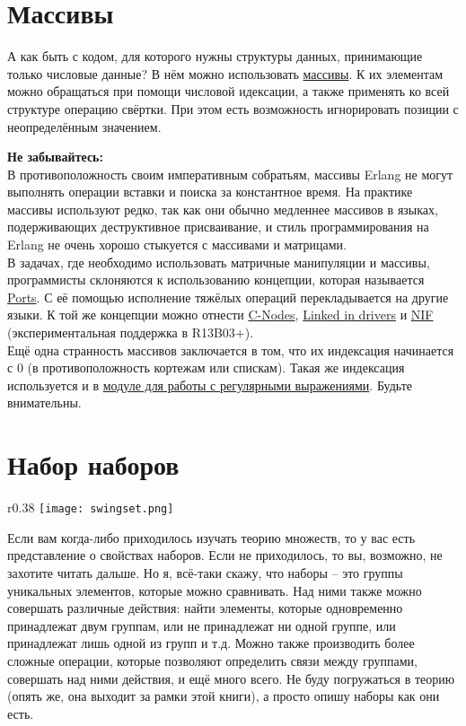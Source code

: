 \section{Массивы}
\label{arrays}
А как быть с кодом, для которого нужны структуры данных, принимающие только числовые данные?
В нём можно использовать \href{http://erldocs.com/R15B/stdlib/array.html}{массивы}.
К их элементам можно обращаться при помощи числовой идексации, а также применять ко всей структуре операцию свёртки.
При этом есть возможность игнорировать позиции с неопределённым значением.
\colorbox{lorange}
{
    \begin{minipage}{1.0\linewidth}
        \textbf{Не забывайтесь:}\\
В противоположность своим императивным собратьям, массивы Erlang не могут выполнять операции вставки и поиска за константное время.
На практике массивы используют редко, так как они обычно медленнее массивов в языках, подерживающих деструктивное присваивание, и стиль программирования на Erlang не очень хорошо стыкуется с массивами и матрицами.\\
В задачах, где необходимо использовать матричные манипуляции и массивы, программисты склоняются к использованию концепции, которая называется \href{http://www.erlang.org/doc/tutorial/c\_port.html}{Ports}.
С её помощью исполнение тяжёлых операций перекладывается на другие языки.
К той же концепции можно отнести \href{http://www.erlang.org/doc/tutorial/cnode.html}{C-Nodes}, \href{http://www.erlang.org/doc/tutorial/c\_portdriver.html}{Linked in drivers} и \href{http://erldocs.com/R15B/erts/erl\_nif.html}{NIF} (экспериментальная поддержка в R13B03+).\\
Ещё одна странность массивов заключается в том, что их индексация начинается с 0 (в противоположность кортежам или спискам).
Такая же индексация используется и в \href{http://erldocs.com/R15B/stdlib/re.html}{модуле для работы с регулярными выражениями}.
Будьте внимательны.
    \end{minipage}
}
\section{Набор наборов}
\label{a-set-of-sets}
\begin{wrapfigure}{r}{0.38\linewidth}
    \texttt{[image: swingset.png]}
\end{wrapfigure}
Если вам когда\--либо приходилось изучать теорию множеств, то у вас есть представление о свойствах наборов.
Если не приходилось, то вы, возможно, не захотите читать дальше.
Но я, всё\--таки скажу, что наборы \--- это группы уникальных элементов, которые можно сравнивать.
Над ними также можно совершать  различные действия: найти элементы, которые одновременно принадлежат двум группам, или не принадлежат ни одной группе, или принадлежат лишь одной из групп и т.д.
Можно также производить более сложные операции, которые позволяют определить связи между группами, совершать над ними действия, и ещё много всего.
Не буду погружаться в теорию (опять же, она выходит за рамки этой книги), а просто опишу наборы как они есть.

